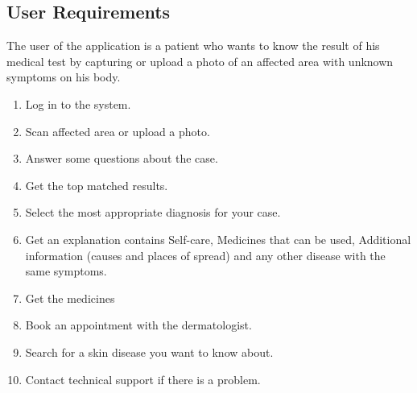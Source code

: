 \subsection{User Requirements}
The user of the application is a patient who wants to know the result of his medical test by capturing or upload a photo of an affected area with unknown symptoms on his body.
\vspace{0.50cm}
\begin{enumerate}[label=\fbox{\arabic*}]
	\item Log in to the system.
	\item Scan affected area or upload a photo.
    \item Answer some questions about the case.
    \item Get the top matched results.
    \item Select the most appropriate diagnosis for your case.
    \item Get an explanation contains Self-care, Medicines that can be used, Additional information (causes and places of spread) and any other disease with the same symptoms.
    \item Get the medicines
    \item Book an appointment with the dermatologist.
    \item Search for a skin disease you want to know about.
    \item Contact technical support if there is a problem.
\end{enumerate}
\newpage
